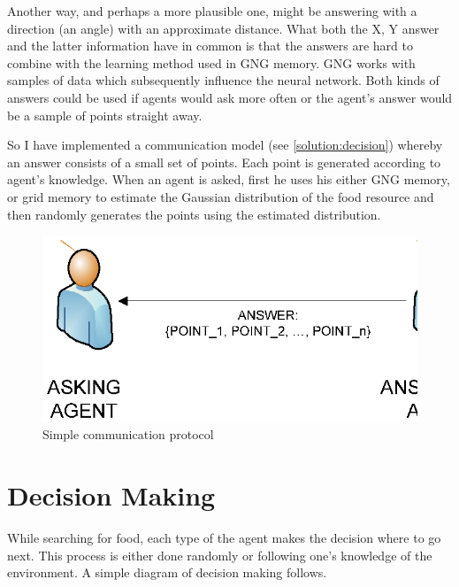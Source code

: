 Another way, and perhaps a more plausible one, might be answering with a direction (an angle) with an approximate distance. What both the X, Y answer and the latter information have in common is that the answers are hard to combine with the learning method used in GNG memory. GNG works with samples of data which subsequently influence the neural network. Both kinds of answers could be used if agents would ask more often or the agent's answer would be a sample of points straight away.

So I have implemented a communication model (see \ref{solution:decision}) whereby an answer consists of a small set of points. Each point is generated according to agent's knowledge. When an agent is asked, first he uses his either GNG memory, or grid memory to estimate the Gaussian distribution of the food resource and then randomly generates the points using the estimated distribution.

\begin{figure}
  \centering                                
  \includegraphics[scale=0.7]{diagrams/solution/communication.eps}    
  \caption{Simple communication protocol}
  \label{solution:communication}
\end{figure}

\section{Decision Making}

While searching for food, each type of the agent makes the decision where to go next. This process is either done randomly or following one's knowledge of the environment. A simple diagram of decision making follows.

